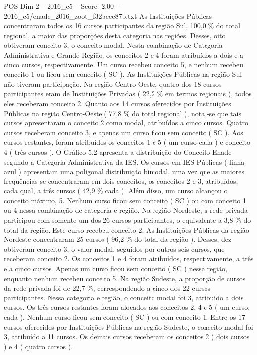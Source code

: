\begin{textsample}{POS Dim 2 – 2016\_c5 – Score -2.00 – 2016\_c5/enade\_2016\_zoot\_f32beec87b.txt}
As Instituições Públicas concentraram todos os 16 cursos participantes da região Sul, 100,0 \% do total regional, a maior das proporções desta categoria nas regiões.
Desses, oito obtiveram conceito 3, o conceito modal.
Nesta combinação de Categoria Administrativa e Grande Região, os conceitos 2 e 4 foram atribuídos a dois e a cinco cursos, respectivamente.
Um curso recebeu conceito 5, e nenhum recebeu conceito 1 ou ficou sem conceito ( SC ).
As Instituições Públicas na região Sul não tiveram participação.
Na região Centro-Oeste, quatro dos 18 cursos participantes eram de Instituições Privadas ( 22,2 \% em termos regionais ), todos eles receberam conceito 2.
Quanto aos 14 cursos oferecidos por Instituições Públicas na região Centro-Oeste ( 77,8 \% do total regional ), nota -se que tais cursos apresentaram o conceito 2 como modal, atribuídos a cinco cursos.
Quatro cursos receberam conceito 3, e apenas um curso ficou sem conceito ( SC ).
Aos cursos restantes, foram atribuídos os conceitos 1 e 5 ( um curso cada ) e conceito 4 ( três cursos ).
O Gráfico 5.2 apresenta a distribuição do Conceito Enade segundo a Categoria Administrativa da IES.
Os cursos em IES Públicas ( linha azul ) apresentam uma poligonal distribuição bimodal, uma vez que as maiores frequências se concentraram em dois conceitos, os conceitos 2 e 3, atribuídos, cada qual, a três cursos ( 42,9 \% cada ).
Além disso, um curso alcançou o conceito máximo, 5.
Nenhum curso ficou sem conceito ( SC ) ou com conceito 1 ou 4 nessa combinação de categoria e região.
Na região Nordeste, a rede privada participou com somente um dos 26 cursos participantes, o equivalente a 3,8 \% do total da região.
Este curso recebeu conceito 2.
As Instituições Públicas da região Nordeste concentraram 25 cursos ( 96,2 \% do total da região ).
Desses, dez obtiveram conceito 3, o valor modal, seguidos por outros seis cursos, que receberam conceito 2.
Os conceitos 1 e 4 foram atribuídos, respectivamente, a três e a cinco cursos.
Apenas um curso ficou sem conceito ( SC ) nessa região, enquanto nenhum recebeu conceito 5.
Na região Sudeste, a proporção de cursos da rede privada foi de 22,7 \%, correspondendo a cinco dos 22 cursos participantes.
Nessa categoria e região, o conceito modal foi 3, atribuído a dois cursos.
Os três cursos restantes foram alocados aos conceitos 2, 4 e 5 ( um curso, cada ).
Nenhum curso ficou sem conceito ( SC ) ou com conceito 1.
Entre os 17 cursos oferecidos por Instituições Públicas na região Sudeste, o conceito modal foi 3, atribuído a 11 cursos.
Os demais cursos receberam os conceitos 2 ( dois cursos ) e 4 ( quatro cursos ).

\end{textsample}
